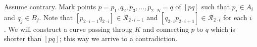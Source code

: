 Assume contrary.
Mark points $p=p_1,q_2,p_3,\dots,p_{2\cdot N}=q$ of $[pq]$ such that $p_i\in A_i$ and $q_j\in B_j$.
Note that $[p_{2\cdot i-1}q_{2\cdot i}]\in \mathcal{R}_{2\cdot i-1}$ 
and 
$[q_{2\cdot i}p_{2\cdot i+1}]\in \mathcal{R}_{2\cdot i}$ for each $i$.
We will construct a curve passing throug $K$ and connecting $p$ to $q$ which is shorter than $[pq]$;
this way we arrive to a contradiction. 







\qeds

